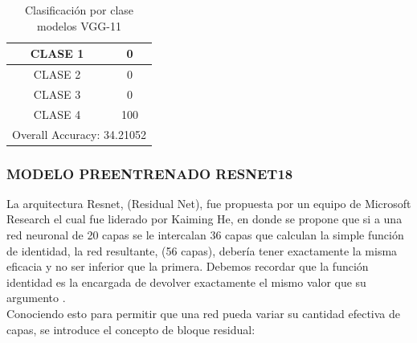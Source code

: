 			\begin{table}[ht]
				\centering
				\begin{tabular}{|c|c|}
					\hline
					CLASE 1 & 0 \bigstrut\\
					\hline
					CLASE 2 & 0 \bigstrut\\
					\hline
					CLASE 3 & 0 \bigstrut\\
					\hline
					CLASE 4 & 100 \bigstrut\\
					\hline
					\multicolumn{2}{|c|}{Overall Accuracy: 34.21052} \bigstrut\\
					\hline
				\end{tabular}%
				\caption{Clasificación por clase modelos VGG-11}
				\label{fig:clase_VGG11}
			\end{table}%
			
		
			\newpage
			\subsubsection{\MakeUppercase{Modelo preentrenado RESNET18}}
				La arquitectura Resnet, (Residual Net), fue propuesta por un equipo de Microsoft Research el cual fue liderado por Kaiming He, en donde se propone que si a una red neuronal de 20 capas se le intercalan 36 capas que calculan la simple función de identidad, la red resultante, (56 capas), debería tener exactamente la misma eficacia y no ser inferior que la primera. Debemos recordar que la función identidad es la encargada de devolver exactamente el mismo valor que su argumento \cite{ref_4}.\\
				
				Conociendo esto para permitir que una red pueda variar su cantidad efectiva de capas, se introduce el concepto de bloque residual:
	
